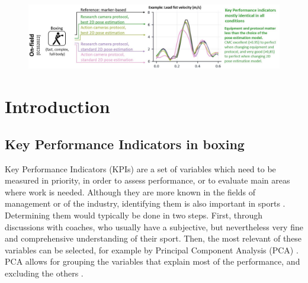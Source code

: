 \begin{figure}[hbtp]
	\centering
      \captionsetup{justification=centering}
	\def\svgwidth{1\columnwidth}
	\fontsize{10pt}{10pt}\selectfont
	\includegraphics[width=\linewidth]{"../Intro/Figures/Fig_VisAbstract4.JPG"}
	\label{fig_visabstract4}
\end{figure}


\newpage

\section{Introduction}

\subsection{Key Performance Indicators in boxing}

Key Performance Indicators (KPIs) are a set of variables which need to be measured in priority, in order to assess performance, or to evaluate main areas where work is needed. Although they are more known in the fields of management or of the industry, identifying them is also important in sports \cite{Hughes2002,Butterworth2013}. Determining them would typically be done in two steps. First, through discussions with coaches, who usually have a subjective, but nevertheless very fine and comprehensive understanding of their sport. Then, the most relevant of these variables can be selected, for example by Principal Component Analysis (PCA) \cite{Hotelling1933}. PCA allows for grouping the variables that explain most of the performance, and excluding the others \cite{ODonoghue2008}.


